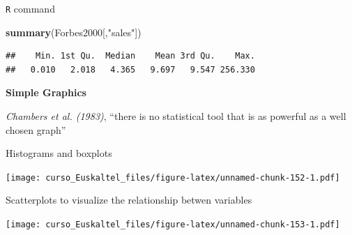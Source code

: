 \documentclass[]{book}
\newenvironment{Shaded}{\begin{snugshade}}{\end{snugshade}}
\newcommand{\KeywordTok}[1]{\textcolor[rgb]{0.13,0.29,0.53}{\textbf{#1}}}
\newcommand{\DataTypeTok}[1]{\textcolor[rgb]{0.13,0.29,0.53}{#1}}
\newcommand{\DecValTok}[1]{\textcolor[rgb]{0.00,0.00,0.81}{#1}}
\newcommand{\StringTok}[1]{\textcolor[rgb]{0.31,0.60,0.02}{#1}}
\newcommand{\OperatorTok}[1]{\textcolor[rgb]{0.81,0.36,0.00}{\textbf{#1}}}
\newcommand{\NormalTok}[1]{#1}
\begin{document}
\texttt{R} command

\begin{Shaded}
\begin{Highlighting}[]
\KeywordTok{summary}\NormalTok{(Forbes2000[,}\StringTok{"sales"}\NormalTok{])}
\end{Highlighting}
\end{Shaded}

\begin{verbatim}
##    Min. 1st Qu.  Median    Mean 3rd Qu.    Max. 
##   0.010   2.018   4.365   9.697   9.547 256.330
\end{verbatim}

\textbf{Simple Graphics}

\emph{Chambers et al. (1983)}, ``there is no statistical tool that is as
powerful as a well chosen graph''

Histograms and boxplots

\begin{Shaded}
\end{Shaded}

\texttt{[image: curso\_Euskaltel\_files/figure-latex/unnamed-chunk-152-1.pdf]}

Scatterplots to visualize the relationship betwen variables

\texttt{[image: curso\_Euskaltel\_files/figure-latex/unnamed-chunk-153-1.pdf]}
\end{document}
